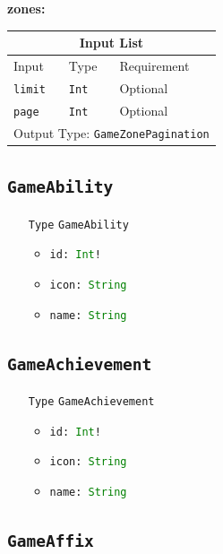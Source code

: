 \documentclass[10pt, a4paper]{memoir}
\numberwithin{equation}{section}
\theoremstyle{plain}
\theoremstyle{defp}
\theoremstyle{dotless}
\theoremstyle{definition}
\theoremstyle{dotless}
\theoremstyle{dotless}
\theoremstyle{defp}
\theoremstyle{defp}
\theoremstyle{be}          %
\theoremstyle{defp}
\newcommand\ttt[1]{\texttt{#1}}
\newcommand\type[1]{\ttt{\textcolor{green}{#1}}}
\begin{document}
\newpage

\textbf{zones:}

\begin{table}[h!]
	\centering
	\begin{tabular}{ |p{4.2cm}|p{6cm}|p{3cm}|  }
		\hline
		\multicolumn{3}{|c|}{Input List} \\
		\hline
		Input & Type & Requirement\\
		\hline
		\ttt{limit} & \ttt{Int} & Optional\\
		\ttt{page} & \ttt{Int} & Optional\\
		\hline
		\multicolumn{3}{|c|}{Output Type: \ttt{GameZonePagination}} \\
		\hline
	\end{tabular}
\end{table}

\subsection{\ttt{GameAbility}}\label{sec:GameAbility}

\begin{itemize}[noitemsep,topsep=1pt]
\item[\ttt{Type}] \ttt{GameAbility}
\begin{itemize}[itemsep=1pt,topsep=1pt]
\item \ttt{id: \type{Int}!}
\item \ttt{icon: \type{String}}
\item \ttt{name: \type{String}}
\end{itemize}
\end{itemize}

\subsection{\ttt{GameAchievement}}\label{sec:GameAchievement}

\begin{itemize}[noitemsep,topsep=1pt]
\item[\ttt{Type}] \ttt{GameAchievement}
\begin{itemize}[itemsep=1pt,topsep=1pt]
\item \ttt{id: \type{Int}!}
\item \ttt{icon: \type{String}}
\item \ttt{name: \type{String}}
\end{itemize}
\end{itemize}

\subsection{\ttt{GameAffix}}\label{sec:GameAffix}
\end{document}
